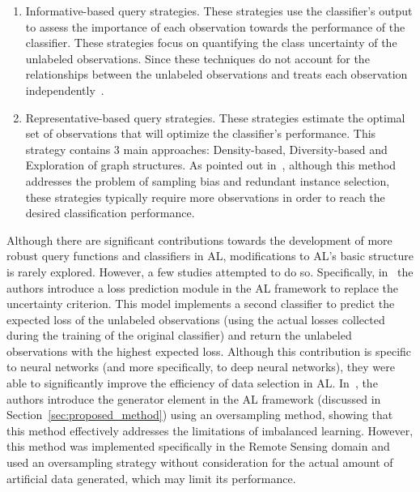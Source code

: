 \documentclass[parskip=full]{scrartcl}
\begin{document}
\begin{enumerate}

    \item Informative-based query strategies. These strategies use the
        classifier's output to assess the importance of each observation
        towards the performance of the classifier. These strategies focus on
        quantifying the class uncertainty of the unlabeled observations.
        Since these techniques do not account for the relationships between
        the unlabeled observations and treats each observation
        independently~\cite{Fu2013}.

    \item Representative-based query strategies. These strategies estimate the
        optimal set of observations that will optimize the classifier's
        performance. This strategy contains 3 main approaches: Density-based,
        Diversity-based and Exploration of graph structures. As pointed out
        in~\cite{Kumar2020}, although this method addresses the problem of
        sampling bias and redundant instance selection, these strategies
        typically require more observations in order to reach the desired
        classification performance.

\end{enumerate}

Although there are significant contributions towards the development of more
robust query functions and classifiers in AL, modifications to AL's basic
structure is rarely explored. However, a few studies attempted to do so.
Specifically, in~\cite{Yoo2019} the authors introduce a loss prediction module
in the AL framework to replace the uncertainty criterion. This model
implements a second classifier to predict the expected loss of the unlabeled
observations (using the actual losses collected during the training of the
original classifier) and return the unlabeled observations with the highest
expected loss. Although this contribution is specific to neural networks (and
more specifically, to deep neural networks), they were able to significantly
improve the efficiency of data selection in AL\@. In~\cite{Fonseca2021}, the
authors introduce the generator element in the AL framework (discussed in
Section~\ref{sec:proposed_method}) using an oversampling method, showing that
this method effectively addresses the limitations of imbalanced learning.
However, this method was implemented specifically in the Remote Sensing domain
and used an oversampling strategy without consideration for the actual amount
of artificial data generated, which may limit its performance.
\end{document}
